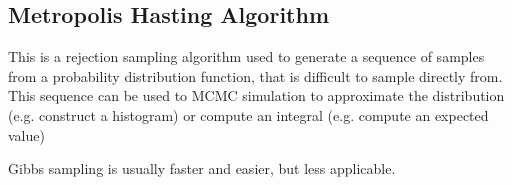 \subsection*{Metropolis Hasting Algorithm}
This is a rejection sampling algorithm used to generate a sequence of samples 
from a probability distribution function, that is difficult to sample directly from.
This sequence can be used to MCMC simulation to approximate the distribution (e.g. construct a histogram) or compute an integral (e.g. compute an expected value)

Gibbs sampling is usually faster and easier, but less applicable.
